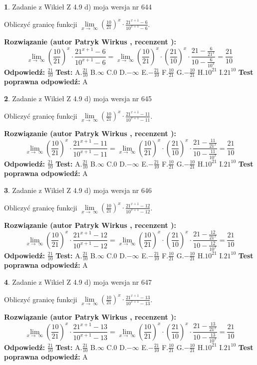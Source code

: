 \documentclass[12pt, a4paper]{article}
\theoremstyle{definition} %
\newtheorem{zad}{}
\newcommand{\zadStart}[1]{\begin{zad}#1\newline}
\newcommand{\zadStop}{\end{zad}}
\newcommand{\rozwStart}[2]{\noindent \textbf{Rozwiązanie (autor #1 , recenzent #2): }\newline}
\newcommand{\rozwStop}{\newline}
\newcommand{\odpStart}{\noindent \textbf{Odpowiedź:}\newline}
\newcommand{\odpStop}{\newline}
\newcommand{\testStart}{\noindent \textbf{Test:}\newline}
\newcommand{\testStop}{\newline}
\newcommand{\kluczStart}{\noindent \textbf{Test poprawna odpowiedź:}\newline}
\newcommand{\kluczStop}{\newline}
\begin{document}
\zadStart{Zadanie z Wikieł Z 4.9 d) moja wersja nr 644}


Obliczyć granicę funkcji  $\lim\limits_{x\to\ \infty}(\frac{10}{21})^{x}\cdot\frac{21^{x+1}-6}{10^{x+1}-6}$.
\zadStop
\rozwStart{Patryk Wirkus}{}
$$\lim\limits_{x\to\ \infty}(\frac{10}{21})^{x}\cdot\frac{21^{x+1}-6}{10^{x+1}-6}=\lim\limits_{x\to\ \infty}(\frac{10}{21})^{x}\cdot(\frac{21}{10})^{x} \cdot \frac{21-\frac{6}{21^{x}}}{10-\frac{6}{10^{x}}} = \frac{21}{10}$$
\rozwStop
\odpStart
$\frac{21}{10}$
\odpStop
\testStart
A.$\frac{21}{10}$ B.$\infty$ C.$0$ D.$-\infty$ E.$-\frac{21}{10}$
F.$\frac{10}{21}$ G.$-\frac{10}{21}$
H.$10^{21}$
I.$21^{10}$
\testStop
\kluczStart
A
\kluczStop



\zadStart{Zadanie z Wikieł Z 4.9 d) moja wersja nr 645}


Obliczyć granicę funkcji  $\lim\limits_{x\to\ \infty}(\frac{10}{21})^{x}\cdot\frac{21^{x+1}-11}{10^{x+1}-11}$.
\zadStop
\rozwStart{Patryk Wirkus}{}
$$\lim\limits_{x\to\ \infty}(\frac{10}{21})^{x}\cdot\frac{21^{x+1}-11}{10^{x+1}-11}=\lim\limits_{x\to\ \infty}(\frac{10}{21})^{x}\cdot(\frac{21}{10})^{x} \cdot \frac{21-\frac{11}{21^{x}}}{10-\frac{11}{10^{x}}} = \frac{21}{10}$$
\rozwStop
\odpStart
$\frac{21}{10}$
\odpStop
\testStart
A.$\frac{21}{10}$ B.$\infty$ C.$0$ D.$-\infty$ E.$-\frac{21}{10}$
F.$\frac{10}{21}$ G.$-\frac{10}{21}$
H.$10^{21}$
I.$21^{10}$
\testStop
\kluczStart
A
\kluczStop



\zadStart{Zadanie z Wikieł Z 4.9 d) moja wersja nr 646}


Obliczyć granicę funkcji  $\lim\limits_{x\to\ \infty}(\frac{10}{21})^{x}\cdot\frac{21^{x+1}-12}{10^{x+1}-12}$.
\zadStop
\rozwStart{Patryk Wirkus}{}
$$\lim\limits_{x\to\ \infty}(\frac{10}{21})^{x}\cdot\frac{21^{x+1}-12}{10^{x+1}-12}=\lim\limits_{x\to\ \infty}(\frac{10}{21})^{x}\cdot(\frac{21}{10})^{x} \cdot \frac{21-\frac{12}{21^{x}}}{10-\frac{12}{10^{x}}} = \frac{21}{10}$$
\rozwStop
\odpStart
$\frac{21}{10}$
\odpStop
\testStart
A.$\frac{21}{10}$ B.$\infty$ C.$0$ D.$-\infty$ E.$-\frac{21}{10}$
F.$\frac{10}{21}$ G.$-\frac{10}{21}$
H.$10^{21}$
I.$21^{10}$
\testStop
\kluczStart
A
\kluczStop



\zadStart{Zadanie z Wikieł Z 4.9 d) moja wersja nr 647}


Obliczyć granicę funkcji  $\lim\limits_{x\to\ \infty}(\frac{10}{21})^{x}\cdot\frac{21^{x+1}-13}{10^{x+1}-13}$.
\zadStop
\rozwStart{Patryk Wirkus}{}
$$\lim\limits_{x\to\ \infty}(\frac{10}{21})^{x}\cdot\frac{21^{x+1}-13}{10^{x+1}-13}=\lim\limits_{x\to\ \infty}(\frac{10}{21})^{x}\cdot(\frac{21}{10})^{x} \cdot \frac{21-\frac{13}{21^{x}}}{10-\frac{13}{10^{x}}} = \frac{21}{10}$$
\rozwStop
\odpStart
$\frac{21}{10}$
\odpStop
\testStart
A.$\frac{21}{10}$ B.$\infty$ C.$0$ D.$-\infty$ E.$-\frac{21}{10}$
F.$\frac{10}{21}$ G.$-\frac{10}{21}$
H.$10^{21}$
I.$21^{10}$
\testStop
\kluczStart
A
\kluczStop
\end{document}
